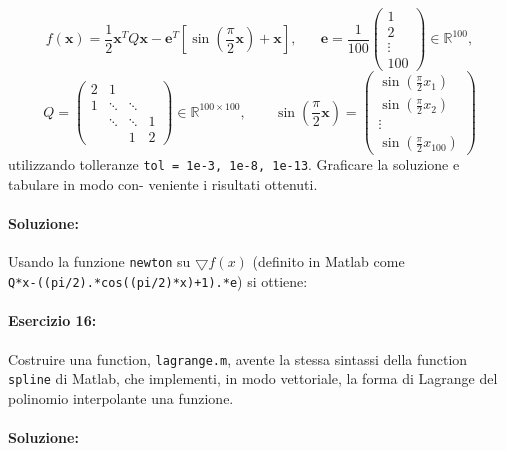 \documentclass[12pt]{article}
\begin{document}
\begin{equation*} 
    f(\boldsymbol{x})=\frac{1}{2}\boldsymbol{x}^TQ\boldsymbol{x}-\boldsymbol{e}^T\left[ \sin(\frac{\pi}{2}\boldsymbol{x})+\boldsymbol{x}\right],\;\;\;\;\;\;
    \boldsymbol{e}=\frac{1}{100}
    \begin{pmatrix}
        1\\
        2\\
        \vdots \\
        100
    \end{pmatrix}
    \in \mathbb{R}^{100},
\end{equation*}
\begin{equation*}
    Q=
    \begin{pmatrix}
        2 & 1 &  & \\
        1 & \ddots &\ddots& \\
        &\ddots &\ddots &1 \\
        & &  1&2
    \end{pmatrix}
    \in \mathbb{R}^{100\times 100}, \;\;\;\;\;\;\;\sin(\frac{\pi}{2}\boldsymbol{x}) =
    \begin{pmatrix}
        \sin(\frac{\pi}{2}x_1)\\
        \sin(\frac{\pi}{2}x_2)\\
        \vdots \\
        \sin(\frac{\pi}{2}x_{100})
    \end{pmatrix}
\end{equation*}
utilizzando tolleranze \texttt{tol = 1e-3, 1e-8, 1e-13}. Graficare la soluzione e tabulare in modo con- veniente i risultati ottenuti.
\paragraph{Soluzione:}
Usando la funzione \texttt{newton} su \(\bigtriangledown f(x)\) (definito in Matlab come \\ \texttt{Q*x-((pi/2).*cos((pi/2)*x)+1).*e}) si ottiene:


\paragraph{Esercizio 16:}
Costruire una function, \texttt{lagrange.m}, avente la stessa sintassi della function \texttt{spline}
di Matlab, che implementi, in modo vettoriale, la forma di Lagrange del polinomio interpolante una
funzione.

\paragraph{Soluzione:}
\end{document}
